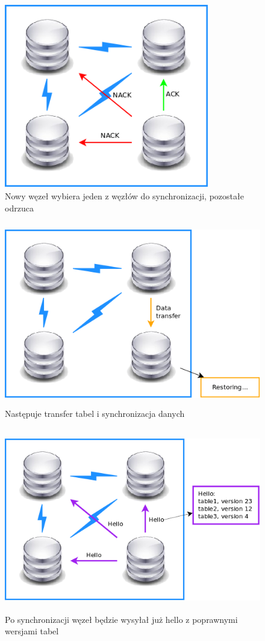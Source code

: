 \documentclass[a4paper, oneside, 11pt]{report}
\begin{document}
\begin{figure}[h]
\centering
\includegraphics[height=8cm]{restore_restore_ack.png}
\caption{Nowy węzeł wybiera jeden z węzłów do synchronizacji, pozostałe odrzuca}
\end{figure}

\begin{figure}[h]
\centering
\includegraphics[height=8cm]{restore_restore_data_transfer.png}
\caption{Następuje transfer tabel i synchronizacja danych}
\end{figure}

\begin{figure}[h]
\centering
\includegraphics[height=8cm]{restore_after_sync_hello.png}
\caption{Po synchronizacji węzeł będzie wysyłał już hello z poprawnymi wersjami tabel}
\end{figure}
\end{document}
